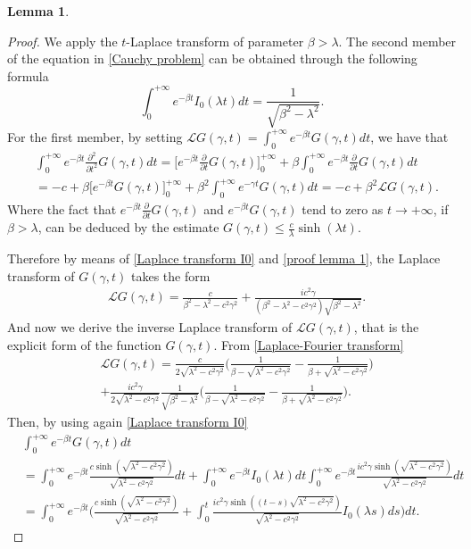 \documentclass{article}
\theoremstyle{definition}
\newtheorem{lemma}{Lemma}[section]
\numberwithin{equation}{section}
\begin{document}
\begin{lemma}
\begin{proof}
We apply the $t$-Laplace transform of parameter $\beta>\lambda$. The second member of the equation in \eqref{Cauchy problem} can be obtained through the following formula
\begin{equation}\label{Laplace transform I0}
\int_0^{+\infty}e^{-\beta t}I_0(\lambda t)dt = \frac{1}{\sqrt{\beta^2-\lambda^2}}.
\end{equation}
For the first member, by setting $\mathcal{L}G(\gamma,t)=\int_0^{+\infty}e^{-\beta t}G(\gamma,t)dt$, we have that
\begin{align}\label{proof lemma 1}
&\int_0^{+\infty}e^{-\beta t}\frac{\partial^2}{\partial t^2}G(\gamma,t)dt = \bigg[e^{-\beta t}\frac{\partial}{\partial t}G(\gamma,t)\bigg]_{0}^{+\infty}+\beta\int_0^{+\infty}e^{-\beta t}\frac{\partial}{\partial t}G(\gamma,t)dt \nonumber\\
&=-c+\beta\bigg[e^{-\beta t}G(\gamma,t)\bigg]_{0}^{+\infty}+\beta^2\int_0^{+\infty}e^{-\gamma t}G(\gamma,t)dt = -c+\beta^2\mathcal{L}G(\gamma,t).
\end{align}
Where the fact that $e^{-\beta t}\frac{\partial}{\partial t}G(\gamma,t)$ and $e^{-\beta t}G(\gamma,t)$ tend to zero as $t\to +\infty$, if $\beta>\lambda$, can be deduced by the estimate $G(\gamma,t)\leq \frac{c}{\lambda}\sinh(\lambda t)$. 

Therefore by means of \eqref{Laplace transform I0} and \eqref{proof lemma 1}, the Laplace transform of $G(\gamma,t)$ takes the form
\begin{align}\label{Laplace-Fourier transform}
&\mathcal{L}G(\gamma,t)  =\frac{c}{\beta^2-\lambda^2-c^2\gamma^2}+\frac{ic^2\gamma}{(\beta^2-\lambda^2-c^2\gamma^2)\sqrt{\beta^2-\lambda^2}}.
\end{align}
And now we derive the inverse Laplace transform of $\mathcal{L}G(\gamma,t)$, that is the explicit form of the function $G(\gamma,t)$. From \eqref{Laplace-Fourier transform}
\begin{align*}
&\mathcal{L}G(\gamma,t) =\frac{c}{2\sqrt{\lambda^2-c^2\gamma^2}}\bigg(\frac{1}{\beta-\sqrt{\lambda^2-c^2\gamma^2}} -\frac{1}{\beta+\sqrt{\lambda^2-c^2\gamma^2}}\bigg)\\
&+\frac{ic^2\gamma}{2\sqrt{\lambda^2-c^2\gamma^2}}\frac{1}{\sqrt{\beta^2-\lambda^2}}\bigg(\frac{1}{\beta-\sqrt{\lambda^2-c^2\gamma^2}} -\frac{1}{\beta+\sqrt{\lambda^2-c^2\gamma^2}}\bigg).
\end{align*}
Then, by using again \eqref{Laplace transform I0}
\begin{align*}
&\int_0^{+\infty}e^{-\beta t}G(\gamma,t)dt \\&=\int_{0}^{+\infty}e^{-\beta t}\frac{c\sinh(\sqrt{\lambda^2-c^2\gamma^2})}{\sqrt{\lambda^2-c^2\gamma^2}}dt+\int_0^{+\infty}e^{-\beta t}I_0(\lambda t)dt \int_0^{+\infty}e^{-\beta t}\frac{ic^2\gamma\sinh(\sqrt{\lambda^2-c^2\gamma^2})}{\sqrt{\lambda^2-c^2\gamma^2}}dt  \\
&=\int_{0}^{+\infty}e^{-\beta t}\bigg(\frac{c\sinh(\sqrt{\lambda^2-c^2\gamma^2})}{\sqrt{\lambda^2-c^2\gamma^2}}+\int_{0}^t\frac{ic^2\gamma\sinh((t-s)\sqrt{\lambda^2-c^2\gamma^2})}{\sqrt{\lambda^2-c^2\gamma^2}} I_0(\lambda s)ds\bigg)dt.
\end{align*}


\end{proof}
\end{lemma}
\end{document}
